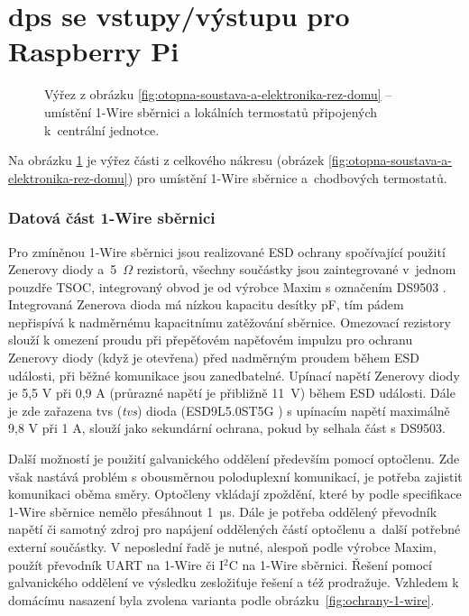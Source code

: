 \section{\acrshort{dps} se vstupy/výstupu pro Raspberry Pi}

\begin{figure}[H]
    \centering
    \def\svgwidth{0.3\columnwidth}
    
    \caption[Výřez pro umístění 1-Wire sběrnici a lokálních termostatů připojených k~centrální jednotce.]{Výřez z obrázku \ref{fig:otopna-soustava-a-elektronika-rez-domu} – umístění 1-Wire sběrnici a lokálních termostatů připojených k~centrální jednotce.}
    \label{fig:vyrez-vstupy-vystupy-rpi}
\end{figure}

\label{sec:dps-se-vstupy-vystupy-pro-raspberry-pi}

Na obrázku \ref{fig:vyrez-vstupy-vystupy-rpi} je výřez části z celkového nákresu (obrázek \ref{fig:otopna-soustava-a-elektronika-rez-domu}) pro umístění 1-Wire sběrnice a~chodbových termostatů.


\subsubsection{Datová část 1-Wire sběrnici}
\label{sec:datova-cast-1-wire-sbernice}
Pro zmíněnou 1-Wire sběrnici jsou realizované ESD ochrany spočívající použití Zenerovy diody a~5~$\Omega$ rezistorů, všechny součástky jsou zaintegrované v~jednom pouzdře TSOC, integrovaný obvod je od výrobce Maxim s označením DS9503 \cite{ds9503}. Integrovaná Zenerova dioda má nízkou kapacitu desítky pF, tím pádem nepřispívá k nadměrnému kapacitnímu zatěžování sběrnice. Omezovací rezistory slouží k omezení proudu při přepěťovém napěťovém impulzu pro ochranu Zenerovy diody (když je otevřena) před nadměrným proudem během ESD události, při běžné komunikace jsou zanedbatelné. Upínací napětí Zenerovy diody je 5,5 V při 0,9 A (průrazné napětí je přibližně 11~V) během ESD události. Dále je zde zařazena \acrshort{tvs} (\textit{\acrlong{tvs}}) dioda (ESD9L5.0ST5G \cite{esd9l5-0st5g}) s upínacím napětí maximálně 9,8 V při 1 A, slouží jako sekundární ochrana, pokud by selhala část s DS9503. 

Další možností je použití galvanického oddělení především pomocí optočlenu. Zde však nastává problém s obousměrnou poloduplexní komunikací, je potřeba zajistit komunikaci oběma směry. Optočleny vkládají zpoždění, které by podle specifikace 1-Wire sběrnice nemělo přesáhnout 1~µs. Dále je potřeba oddělený převodník napětí či samotný zdroj pro napájení oddělených částí optočlenu a~další potřebné externí součástky. V neposlední řadě je nutné, alespoň podle výrobce Maxim,  použít převodník UART na 1-Wire či I$^2$C na 1-Wire sběrnici. Řešení pomocí galvanického oddělení ve výsledku zesložiťuje řešení a též prodražuje. Vzhledem k domácímu nasazení byla zvolena varianta podle obrázku~\ref{fig:ochrany-1-wire}.

